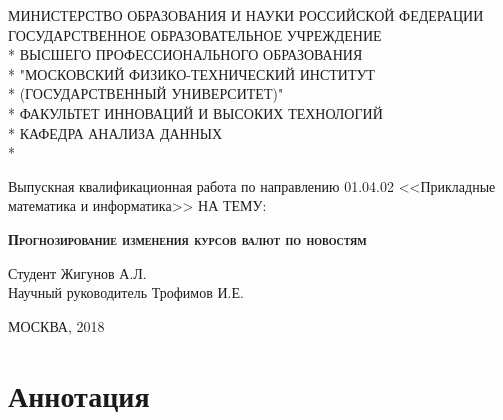 \documentclass[pdftex,14pt,a4paper]{extreport}
\begin{document}
\begin{titlepage}

\newpage

\begin{center}
МИНИСТЕРСТВО ОБРАЗОВАНИЯ И НАУКИ РОССИЙСКОЙ ФЕДЕРАЦИИ \\
\vspace{0.5cm}
ГОСУДАРСТВЕННОЕ ОБРАЗОВАТЕЛЬНОЕ УЧРЕЖДЕНИЕ \\*
ВЫСШЕГО ПРОФЕССИОНАЛЬНОГО ОБРАЗОВАНИЯ\\*
"МОСКОВСКИЙ ФИЗИКО-ТЕХНИЧЕСКИЙ ИНСТИТУТ \\*
(ГОСУДАРСТВЕННЫЙ УНИВЕРСИТЕТ)" \\*
\vspace{0.5cm}
ФАКУЛЬТЕТ ИННОВАЦИЙ И ВЫСОКИХ ТЕХНОЛОГИЙ \\*
КАФЕДРА АНАЛИЗА ДАННЫХ \\*
\hrulefill
\end{center}


\vspace{4em}

\begin{center}
\Large Выпускная квалификационная работа по направлению 01.04.02 <<Прикладные математика и информатика>> \linebreak НА ТЕМУ:
\end{center}

\vspace{2.5em}

\begin{center}
\textsc{\large{\textbf{Прогнозирование изменения курсов валют по новостям}}}
\end{center}


\begin{flushleft}
Студент \hrulefill Жигунов А.Л. \\
\vspace{1.5em}
Научный руководитель \hrulefill Трофимов И.Е.\\
\end{flushleft}

\vspace{\fill}

\begin{center}
МОСКВА, 2018
\end{center}

\end{titlepage}

\section{Аннотация}
\end{document}
